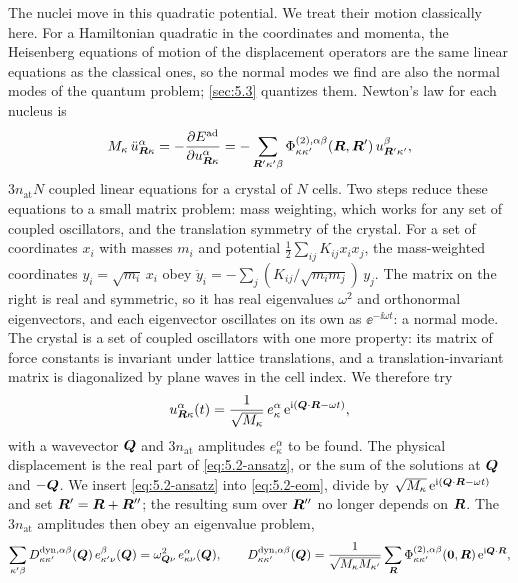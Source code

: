 The nuclei move in this quadratic potential. We treat their motion classically here. For a Hamiltonian quadratic in the coordinates and momenta, the Heisenberg equations of motion of the displacement operators are the same linear equations as the classical ones, so the normal modes we find are also the normal modes of the quantum problem; \cref{sec:5.3} quantizes them. Newton's law for each nucleus is
\begin{equation}
  M_\kappa\,\ddot u^\alpha_{\bm{R}\kappa} = -\frac{\partial E^{\mathrm{ad}}}{\partial u^\alpha_{\bm{R}\kappa}} = -\sum_{\bm{R}'\kappa'\beta}\Phi^{(2),\alpha\beta}_{\kappa\kappa'}(\bm{R},\bm{R}')\,u^\beta_{\bm{R}'\kappa'} ,
  \label{eq:5.2-eom}
\end{equation}
$3n_{\mathrm{at}}N$ coupled linear equations for a crystal of $N$ cells. Two steps reduce these equations to a small matrix problem: mass weighting, which works for any set of coupled oscillators, and the translation symmetry of the crystal. For a set of coordinates $x_i$ with masses $m_i$ and potential $\tfrac12\sum_{ij}K_{ij}x_ix_j$, the mass-weighted coordinates $y_i = \sqrt{m_i}\,x_i$ obey $\ddot y_i = -\sum_j(K_{ij}/\sqrt{m_im_j})\,y_j$. The matrix on the right is real and symmetric, so it has real eigenvalues $\omega^2$ and orthonormal eigenvectors, and each eigenvector oscillates on its own as $\ee^{-\ii\omega t}$: a normal mode. The crystal is a set of coupled oscillators with one more property: its matrix of force constants is invariant under lattice translations, and a translation-invariant matrix is diagonalized by plane waves in the cell index. We therefore try
\begin{equation}
  u^\alpha_{\bm{R}\kappa}(t) = \frac{1}{\sqrt{M_\kappa}}\,e^\alpha_\kappa\,\mathrm{e}^{\mathrm{i}(\bm{Q}\cdot\bm{R} - \omega t)} ,
  \label{eq:5.2-ansatz}
\end{equation}
with a wavevector $\bm{Q}$ and $3n_{\mathrm{at}}$ amplitudes $e^\alpha_\kappa$ to be found. The physical displacement is the real part of \cref{eq:5.2-ansatz}, or the sum of the solutions at $\bm{Q}$ and $-\bm{Q}$. We insert \cref{eq:5.2-ansatz} into \cref{eq:5.2-eom}, divide by $\sqrt{M_\kappa}\,\mathrm{e}^{\mathrm{i}(\bm{Q}\cdot\bm{R} - \omega t)}$ and set $\bm{R}' = \bm{R} + \bm{R}''$; the resulting sum over $\bm{R}''$ no longer depends on $\bm{R}$. The $3n_{\mathrm{at}}$ amplitudes then obey an eigenvalue problem,
\begin{equation}
  \sum_{\kappa'\beta}D^{\mathrm{dyn},\alpha\beta}_{\kappa\kappa'}(\bm{Q})\,e^\beta_{\kappa'\nu}(\bm{Q}) = \omega_{\bm{Q}\nu}^2\,e^\alpha_{\kappa\nu}(\bm{Q}) ,
  \qquad
  D^{\mathrm{dyn},\alpha\beta}_{\kappa\kappa'}(\bm{Q}) = \frac{1}{\sqrt{M_\kappa M_{\kappa'}}}\sum_{\bm{R}}\Phi^{(2),\alpha\beta}_{\kappa\kappa'}(\bm{0},\bm{R})\,\mathrm{e}^{\mathrm{i}\bm{Q}\cdot\bm{R}} ,
  \label{eq:5.2-Ddyn}
\end{equation}
